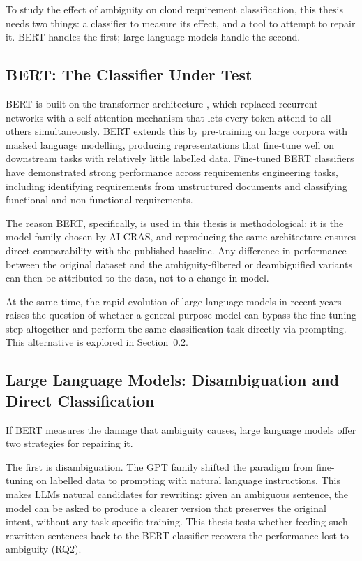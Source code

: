 To study the effect of ambiguity on cloud requirement classification, this thesis needs two things: a classifier to measure its effect, and a tool to attempt to repair it. BERT handles the first; large language models handle the second.

\subsection{BERT: The Classifier Under Test}

BERT \cite{devlin2019bert} is built on the transformer architecture \cite{vaswani2017attention}, which replaced recurrent networks with a self-attention mechanism that lets every token attend to all others simultaneously. BERT extends this by pre-training on large corpora with masked language modelling, producing representations that fine-tune well on downstream tasks with relatively little labelled data. Fine-tuned BERT classifiers have demonstrated strong performance across requirements engineering tasks, including identifying requirements from unstructured documents and classifying functional and non-functional requirements.

The reason BERT, specifically, is used in this thesis is methodological: it is the model family chosen by AI-CRAS, and reproducing the same architecture ensures direct comparability with the published baseline. Any difference in performance between the original dataset and the ambiguity-filtered or deambiguified variants can then be attributed to the data, not to a change in model.

At the same time, the rapid evolution of large language models in recent years raises the question of whether a general-purpose model can bypass the fine-tuning step altogether and perform the same classification task directly via prompting. This alternative is explored in Section~\ref{sec:llm-direct}.

\subsection{Large Language Models: Disambiguation and Direct Classification}
\label{sec:llm-direct}

If BERT measures the damage that ambiguity causes, large language models offer two strategies for repairing it.

The first is disambiguation. The GPT family \cite{openai2023gpt4} shifted the paradigm from fine-tuning on labelled data to prompting with natural language instructions. This makes LLMs natural candidates for rewriting: given an ambiguous sentence, the model can be asked to produce a clearer version that preserves the original intent, without any task-specific training. This thesis tests whether feeding such rewritten sentences back to the BERT classifier recovers the performance lost to ambiguity (RQ2).

